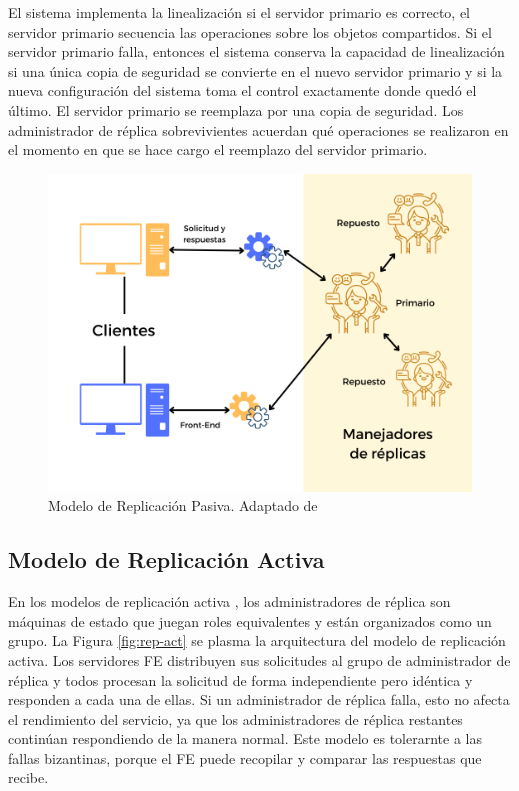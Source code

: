  
 El sistema implementa la linealización si el servidor primario es correcto, el servidor  primario secuencia  las operaciones sobre los objetos compartidos. 
 Si el servidor primario falla, entonces el sistema conserva la capacidad de linealización si una única copia de seguridad se convierte en el nuevo servidor primario y si la nueva configuración del sistema toma el control exactamente donde quedó el último.
 El servidor primario se reemplaza por una copia de seguridad. 
 Los administrador de réplica sobrevivientes acuerdan qué operaciones se realizaron en el momento en que se hace cargo el reemplazo del servidor  primario.
 
 
 	\begin{figure}   
 		 \begin{center}%
 		\includegraphics[width=0.8\linewidth] {9/5.png} 
 		\caption{Modelo de Replicación Pasiva. Adaptado de \cite{Coulouris2011}}
 		\label{fig:rep-pas}
 	\end{center}  
 \end{figure} 
 
  \subsection{Modelo de Replicación Activa} 	
 
	
	 En los modelos de  replicación activa \cite{Coulouris2011}, los administradores de réplica son máquinas de estado que juegan roles equivalentes y están organizados como un grupo. 
	La Figura \ref{fig:rep-act} se plasma la  arquitectura del modelo de  replicación activa. Los servidores FE distribuyen sus solicitudes al grupo de administrador de réplica y todos  procesan la solicitud de forma independiente pero idéntica y responden a cada una de ellas. 
	 Si un administrador de réplica falla, esto no afecta el rendimiento del servicio, ya que los administradores de réplica restantes continúan respondiendo de la manera normal. 
	Este modelo es  tolerarnte a las  fallas bizantinas, porque el FE puede recopilar y comparar las respuestas que recibe.
	 
